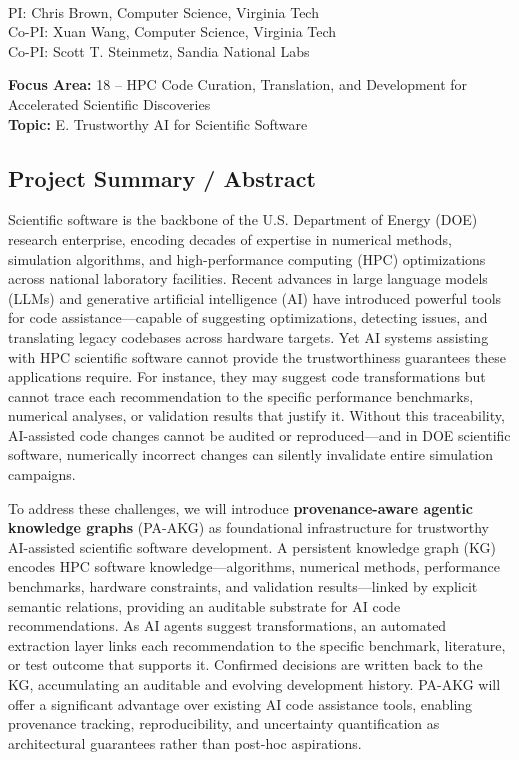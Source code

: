 \begin{center}
    \large{\proposalEighteen} \\ \vspace{0.5pt}
\footnotesize{PI: Chris Brown, Computer Science, Virginia Tech} \\
\footnotesize{Co-PI: Xuan Wang, Computer Science, Virginia Tech} \\
\footnotesize{Co-PI: Scott T. Steinmetz, Sandia National Labs} \\
\end{center}

\small{\noindent\textbf{Focus Area:} 18 -- HPC Code Curation, Translation, and Development for Accelerated Scientific Discoveries} \hfill \\
\small{\textbf{Topic:} E. Trustworthy AI for Scientific Software}

\subsection*{Project Summary / Abstract}

Scientific software is the backbone of the U.S. Department of Energy (DOE) research enterprise, encoding decades of expertise in numerical methods, simulation algorithms, and high-performance computing (HPC) optimizations across national laboratory facilities. Recent advances in large language models (LLMs) and generative artificial intelligence (AI) have introduced powerful tools for code assistance---capable of suggesting optimizations, detecting issues, and translating legacy codebases across hardware targets. Yet AI systems assisting with HPC scientific software cannot provide the trustworthiness guarantees these applications require. For instance, they may suggest code transformations but cannot trace each recommendation to the specific performance benchmarks, numerical analyses, or validation results that justify it. Without this traceability, AI-assisted code changes cannot be audited or reproduced---and in DOE scientific software, numerically incorrect changes can silently invalidate entire simulation campaigns.

To address these challenges, we will introduce \textbf{provenance-aware agentic knowledge graphs} (PA-AKG) as foundational infrastructure for trustworthy AI-assisted scientific software development. A persistent knowledge graph (KG) encodes HPC software knowledge---algorithms, numerical methods, performance benchmarks, hardware constraints, and validation results---linked by explicit semantic relations, providing an auditable substrate for AI code recommendations. As AI agents suggest transformations, an automated extraction layer links each recommendation to the specific benchmark, literature, or test outcome that supports it. Confirmed decisions are written back to the KG, accumulating an auditable and evolving development history. PA-AKG will offer a significant advantage over existing AI code assistance tools, enabling provenance tracking, reproducibility, and uncertainty quantification as architectural guarantees rather than post-hoc aspirations.

